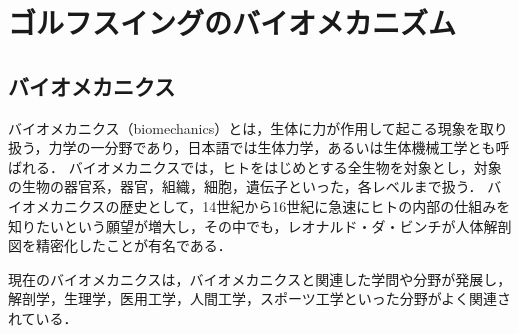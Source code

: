 \chapter{ゴルフスイングのバイオメカニズム}
\section{バイオメカニクス}
%
バイオメカニクス（biomechanics）とは，生体に力が作用して起こる現象を取り扱う，力学の一分野であり，日本語では生体力学，あるいは生体機械工学とも呼ばれる．
バイオメカニクスでは，ヒトをはじめとする全生物を対象とし，対象の生物の器官系，器官，組織，細胞，遺伝子といった，各レベルまで扱う．
バイオメカニクスの歴史として，14世紀から16世紀に急速にヒトの内部の仕組みを知りたいという願望が増大し，その中でも，レオナルド・ダ・ビンチが人体解剖図を精密化したことが有名である．

現在のバイオメカニクスは，バイオメカニクスと関連した学問や分野が発展し，解剖学，生理学，医用工学，人間工学，スポーツ工学といった分野がよく関連されている．

